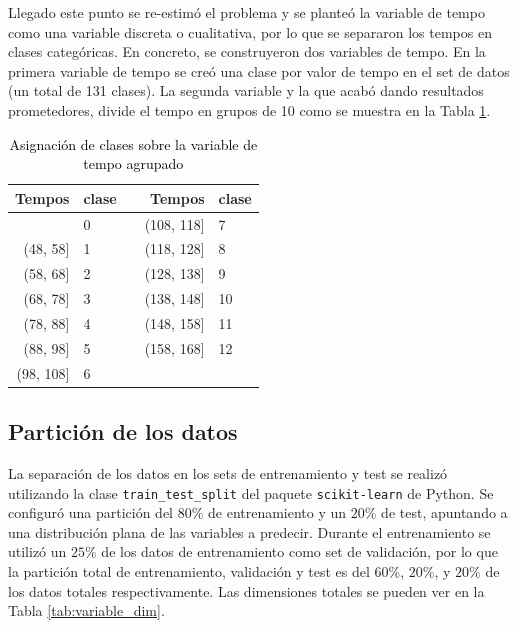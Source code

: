 Llegado este punto se re-estimó el problema y se planteó la variable de tempo como una variable discreta o cualitativa, por lo que se separaron los tempos en clases categóricas. En concreto, se construyeron dos variables de tempo. En la primera variable de tempo se creó una clase por valor de tempo en el set de datos (un total de 131 clases). La segunda variable y la que acabó dando resultados prometedores, divide el tempo en grupos de 10 como se muestra en la Tabla \ref{tab:tempo_classes}.

\begin{table}
\centering
\begin{tabular}{rllrl}
\hline
\textbf{Tempos} & \textbf{clase} &  & \textbf{Tempos} & \textbf{clase} \\ \hline
[38, 48]		&	0			& 	&	(108, 118]			& 7  \\ 
(48, 58]		&	1			& 	&	(118, 128]	  & 8  \\ 
(58, 68]		&	2			& 	&	(128, 138]		& 9  \\ 
(68, 78]		&	3			& 	&	(138, 148]		& 10  \\ 
(78, 88]		&	4			& 	&	(148, 158]		& 11  \\
(88, 98]		&	5			& 	&	(158, 168]		& 12  \\
(98, 108]		&	6			& 	&				&   \\  \hline
\end{tabular}
\caption{\textcolor{black}{Asignación de clases sobre la variable de tempo agrupado}}
\label{tab:tempo_classes}
\end{table}


\subsection{Partición de los datos}\label{sec:particion_de_datos}

\noindent La separación de los datos en los sets de entrenamiento y test se realizó utilizando la clase  \texttt{train\_test\_split} del paquete \texttt{scikit-learn} de Python. Se configuró una partición del $80\%$ de entrenamiento y un $20\%$ de test, apuntando a una distribución plana de las variables a predecir. Durante el entrenamiento se utilizó un $25\%$ de los datos de entrenamiento como set de validación, por lo que la partición total de entrenamiento, validación y test es del $60\%$, $20\%$, y $20\%$ de los datos totales respectivamente. Las dimensiones totales se pueden ver en la Tabla \ref{tab:variable_dim}.

